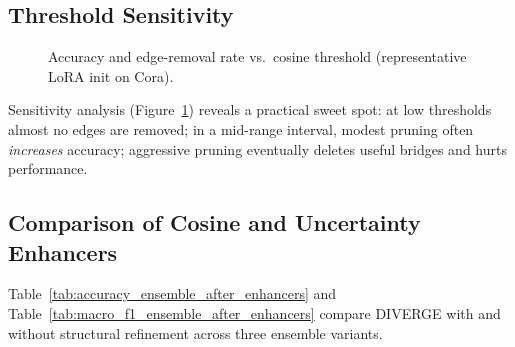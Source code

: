 \subsection{Threshold Sensitivity}
\begin{figure}[htbp]
\centering
{}
\caption{Accuracy and edge-removal rate vs.\ cosine threshold (representative LoRA init on Cora).}
\label{fig:multi}
\end{figure}

Sensitivity analysis (Figure~\ref{fig:multi}) reveals a practical sweet spot: at low
thresholds almost no edges are removed; in a mid-range interval, modest pruning often
\emph{increases} accuracy; aggressive pruning eventually deletes useful bridges and
hurts performance.


\subsection{Comparison of Cosine and Uncertainty Enhancers}
Table~\ref{tab:accuracy_ensemble_after_enhancers} and
Table~\ref{tab:macro_f1_ensemble_after_enhancers} compare DIVERGE with and without
structural refinement across three ensemble variants.

